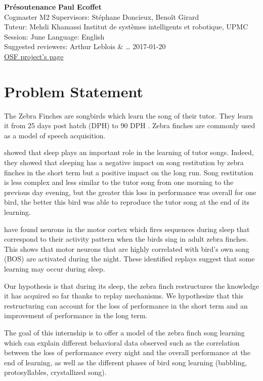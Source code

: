 \documentclass[a4paper]{article}
\begin{document}
\noindent
\large\textbf{Présoutenance} \hfill \textbf{Paul Ecoffet} \\
\normalsize Cogmaster M2 \hfill Supervisors: Stéphane Doncieux, Benoît Girard \\
Tuteur: Mehdi Khamassi \hfill Institut de systèmes intelligents et robotique, UPMC\\
Session: June \hfill Language: English\\
Suggested reviewers: Arthur Leblois \& … \hfill 2017-01-20\\
\href{https://osf.io/ja8k9/}{OSF project's page}


\section*{Problem Statement}

The Zebra Finches are songbirds which learn the song of their tutor. They learn
it from 25 days post hatch (DPH) to 90 DPH \parencite{liu_juvenile_2004}. Zebra
finches are commonly used as a model of speech acquisition.

\textcite{deregnaucourt_how_2005} showed that sleep plays an important role in
the learning of tutor songs. Indeed, they showed that sleeping has a negative
impact on song restitution by zebra finches in the short term but a positive
impact on the long run. Song restitution is less complex and less similar to the
tutor song from one morning to the previous day evening, but the greater this
loss in performance was overall for one bird, the better this bird was able to
reproduce the tutor song at the end of its learning.


\textcite{dave_song_2000} have found neurons in the motor cortex which fires
sequences during sleep that correspond to their activity pattern when the birds
sing in adult zebra finches. This shows that motor neurons that are highly
correlated with bird's own song (BOS) are activated during the night. These
identified replays suggest that some learning may occur during sleep.

Our hypothesis is that during its sleep, the zebra finch restructures the
knowledge it has acquired so far thanks to replay mechanisms. We hypothesize
that this restructuring can account for the loss of performance in the short
term and an improvement of performance in the long term.

The goal of this internship is to offer a model of the zebra finch song
learning which can explain different behavioral data observed such as the
correlation between the loss of performance every night and the overall
performance at the end of learning, as well as the different phases of bird song
learning (babbling, protosyllables, crystallized song).
\end{document}
